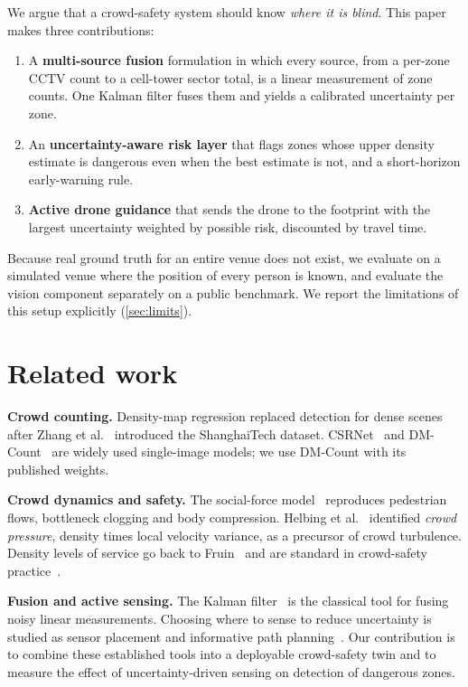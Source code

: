\documentclass[10pt,twocolumn]{article}
\begin{document}
We argue that a crowd-safety system should know \emph{where it is blind}. This paper makes three contributions:
\begin{enumerate}
\item A \textbf{multi-source fusion} formulation in which every source, from a per-zone CCTV count to a cell-tower sector total, is a linear measurement of zone counts. One Kalman filter fuses them and yields a calibrated uncertainty per zone.
\item An \textbf{uncertainty-aware risk layer} that flags zones whose upper density estimate is dangerous even when the best estimate is not, and a short-horizon early-warning rule.
\item \textbf{Active drone guidance} that sends the drone to the footprint with the largest uncertainty weighted by possible risk, discounted by travel time.
\end{enumerate}
Because real ground truth for an entire venue does not exist, we evaluate on a simulated venue where the position of every person is known, and evaluate the vision component separately on a public benchmark. We report the limitations of this setup explicitly (\cref{sec:limits}).

\section{Related work}
\textbf{Crowd counting.} Density-map regression replaced detection for dense scenes after Zhang et al.~\cite{zhang2016mcnn} introduced the ShanghaiTech dataset. CSRNet~\cite{li2018csrnet} and DM-Count~\cite{wang2020dmcount} are widely used single-image models; we use DM-Count with its published weights.

\textbf{Crowd dynamics and safety.} The social-force model~\cite{helbing1995social,helbing2000panic} reproduces pedestrian flows, bottleneck clogging and body compression. Helbing et al.~\cite{helbing2007disasters} identified \emph{crowd pressure}, density times local velocity variance, as a precursor of crowd turbulence. Density levels of service go back to Fruin~\cite{fruin1971} and are standard in crowd-safety practice~\cite{still2014}.

\textbf{Fusion and active sensing.} The Kalman filter~\cite{kalman1960} is the classical tool for fusing noisy linear measurements. Choosing where to sense to reduce uncertainty is studied as sensor placement and informative path planning~\cite{krause2008}. Our contribution is to combine these established tools into a deployable crowd-safety twin and to measure the effect of uncertainty-driven sensing on detection of dangerous zones.
\end{document}
